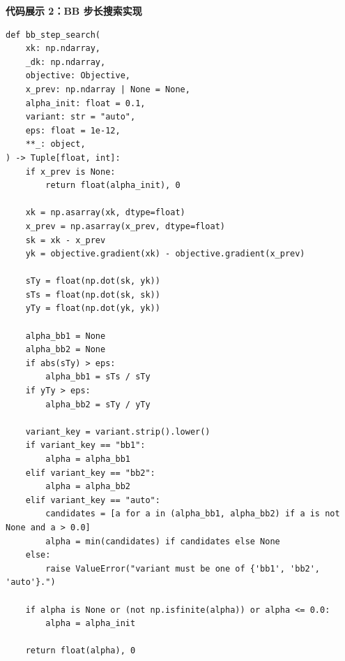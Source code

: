 \documentclass[12pt,a4paper]{ctexart}
\begin{document}
\textbf{代码展示 2：BB 步长搜索实现}
\begin{lstlisting}[caption={BB 步长计算核心代码},label={lst:bb-impl}]
def bb_step_search(
    xk: np.ndarray,
    _dk: np.ndarray,
    objective: Objective,
    x_prev: np.ndarray | None = None,
    alpha_init: float = 0.1,
    variant: str = "auto",
    eps: float = 1e-12,
    **_: object,
) -> Tuple[float, int]:
    if x_prev is None:
        return float(alpha_init), 0

    xk = np.asarray(xk, dtype=float)
    x_prev = np.asarray(x_prev, dtype=float)
    sk = xk - x_prev
    yk = objective.gradient(xk) - objective.gradient(x_prev)

    sTy = float(np.dot(sk, yk))
    sTs = float(np.dot(sk, sk))
    yTy = float(np.dot(yk, yk))

    alpha_bb1 = None
    alpha_bb2 = None
    if abs(sTy) > eps:
        alpha_bb1 = sTs / sTy
    if yTy > eps:
        alpha_bb2 = sTy / yTy

    variant_key = variant.strip().lower()
    if variant_key == "bb1":
        alpha = alpha_bb1
    elif variant_key == "bb2":
        alpha = alpha_bb2
    elif variant_key == "auto":
        candidates = [a for a in (alpha_bb1, alpha_bb2) if a is not None and a > 0.0]
        alpha = min(candidates) if candidates else None
    else:
        raise ValueError("variant must be one of {'bb1', 'bb2', 'auto'}.")

    if alpha is None or (not np.isfinite(alpha)) or alpha <= 0.0:
        alpha = alpha_init

    return float(alpha), 0
\end{lstlisting}
\end{document}
